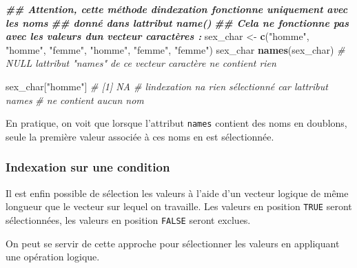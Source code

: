 \documentclass[
]{book}
\newenvironment{Shaded}{\begin{snugshade}}{\end{snugshade}}
\newcommand{\CommentTok}[1]{\textcolor[rgb]{0.56,0.35,0.01}{\textit{#1}}}
\newcommand{\DocumentationTok}[1]{\textcolor[rgb]{0.56,0.35,0.01}{\textbf{\textit{#1}}}}
\newcommand{\FunctionTok}[1]{\textcolor[rgb]{0.13,0.29,0.53}{\textbf{#1}}}
\newcommand{\NormalTok}[1]{#1}
\newcommand{\OtherTok}[1]{\textcolor[rgb]{0.56,0.35,0.01}{#1}}
\newcommand{\StringTok}[1]{\textcolor[rgb]{0.31,0.60,0.02}{#1}}
\begin{document}
\begin{Shaded}
\begin{Highlighting}[]
\DocumentationTok{\#\# Attention, cette méthode d\textquotesingle{}indexation fonctionne uniquement avec les noms}
\DocumentationTok{\#\# donné dans l\textquotesingle{}attribut name()}
\DocumentationTok{\#\# Cela ne fonctionne pas avec les valeurs d\textquotesingle{}un vecteur caractères :}
\NormalTok{sex\_char }\OtherTok{\textless{}{-}} \FunctionTok{c}\NormalTok{(}\StringTok{"homme"}\NormalTok{, }\StringTok{"homme"}\NormalTok{, }\StringTok{"femme"}\NormalTok{, }\StringTok{"homme"}\NormalTok{, }\StringTok{"femme"}\NormalTok{, }\StringTok{"femme"}\NormalTok{)}
\NormalTok{sex\_char}
\FunctionTok{names}\NormalTok{(sex\_char)}
\CommentTok{\# NULL          l\textquotesingle{}attribut "names" de ce vecteur caractère ne contient rien}

\NormalTok{sex\_char[}\StringTok{"homme"}\NormalTok{]}
\CommentTok{\# [1] NA           \# l\textquotesingle{}indexation n\textquotesingle{}a rien sélectionné car l\textquotesingle{}attribut names}
                   \CommentTok{\# ne contient aucun nom}
\end{Highlighting}
\end{Shaded}

En pratique, on voit que lorsque l'attribut \texttt{names} contient des noms en doublons, seule la première valeur associée à ces noms en est sélectionnée.

\subsubsection{Indexation sur une condition}\label{indexation-sur-une-condition}

Il est enfin possible de sélection les valeurs à l'aide d'un vecteur logique de même longueur que le vecteur sur lequel on travaille. Les valeurs en position \texttt{TRUE} seront sélectionnées, les valeurs en position \texttt{FALSE} seront exclues.

On peut se servir de cette approche pour sélectionner les valeurs en appliquant une opération logique.
\end{document}
